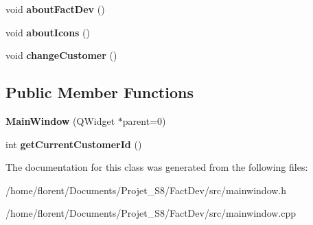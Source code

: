 \begin{DoxyCompactItemize}
\item 
\hypertarget{classMainWindow_af9af9644d45d2af769d18f2370eed83e}{void {\bfseries about\-Fact\-Dev} ()}\label{classMainWindow_af9af9644d45d2af769d18f2370eed83e}

\item 
\hypertarget{classMainWindow_ae6a7598b9931ca8901a62bb95c490e0e}{void {\bfseries about\-Icons} ()}\label{classMainWindow_ae6a7598b9931ca8901a62bb95c490e0e}

\item 
\hypertarget{classMainWindow_afa850634f7968a6e9803a25e905f3178}{void {\bfseries change\-Customer} ()}\label{classMainWindow_afa850634f7968a6e9803a25e905f3178}

\end{DoxyCompactItemize}
\subsection*{Public Member Functions}
\begin{DoxyCompactItemize}
\item 
\hypertarget{classMainWindow_a8b244be8b7b7db1b08de2a2acb9409db}{{\bfseries Main\-Window} (Q\-Widget $\ast$parent=0)}\label{classMainWindow_a8b244be8b7b7db1b08de2a2acb9409db}

\item 
\hypertarget{classMainWindow_a0584b17eb78c07b513524a09bd914042}{int {\bfseries get\-Current\-Customer\-Id} ()}\label{classMainWindow_a0584b17eb78c07b513524a09bd914042}

\end{DoxyCompactItemize}


The documentation for this class was generated from the following files\-:\begin{DoxyCompactItemize}
\item 
/home/florent/\-Documents/\-Projet\-\_\-\-S8/\-Fact\-Dev/src/mainwindow.\-h\item 
/home/florent/\-Documents/\-Projet\-\_\-\-S8/\-Fact\-Dev/src/mainwindow.\-cpp\end{DoxyCompactItemize}
